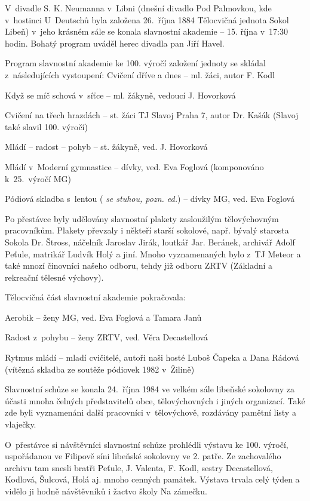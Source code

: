 \documentclass[a5paper, 11pt, twoside]{article}
\newcommand{\pozned}[1]{%
\textit{#1}}
\begin{document}
V~divadle S. K. Neumanna v~Libni (dnešní divadlo Pod Palmovkou, kde
v~hostinci U~Deutschů byla založena 26.~října 1884 Tělocvičná jednota
Sokol Libeň) v~jeho krásném sále se konala slavnostní akademie -- 15.
října v~17:30 hodin. Bohatý program uváděl herec divadla pan Jiří Havel.

Program slavnostní akademie ke 100. výročí založení jednoty se
skládal z~následujících vystoupení:
\smallskip
Cvičení dříve a dnes -- ml. žáci, autor F. Kodl

Když se míč schová v~síťce -- ml. žákyně, vedoucí J. Hovorková

Cvičení na třech hrazdách -- st. žáci TJ Slavoj Praha 7, autor Dr.
Kašák (Slavoj také slavil 100. výročí)

Mládí -- radost -- pohyb -- st. žákyně, ved. J. Hovorková

{\sloppy Mládí v~Moderní gymnastice -- dívky, ved. Eva Foglová (komponováno k~25.~výročí MG) \par}

Pódiová skladba s~lentou (\pozned{se stuhou, pozn. ed.}) -- dívky MG,
ved. Eva Foglová

\smallskip
Po přestávce byly udělovány slavnostní plakety zasloužilým tělovýchovným
pracovníkům. Plakety převzaly i někteří starší sokolové, např. bývalý
starosta Sokola Dr. Štross, náčelník Jaroslav Jirák, loutkář Jar.
Beránek, archivář Adolf Peťule, matrikář Ludvík Holý a jiní. Mnoho
vyznamenaných bylo z~TJ Meteor a také mnozí činovníci našeho odboru,
tehdy již odboru ZRTV (Základní a rekreační tělesné výchovy).

Tělocvičná část slavnostní akademie pokračovala:

\medskip
Aerobik -- ženy MG, ved. Eva Foglová a Tamara Janů

Radost z~pohybu -- ženy ZRTV, ved. Věra Decastellová

Rytmus mládí -- mladí cvičitelé, autoři naši hosté Luboš Čapeka a
Dana Rádová (vítězná skladba ze soutěže pódiovek 1982 v~Žilině)

\medskip
Slavnostní schůze se konala 24.~října 1984 ve velkém sále libeňské
sokolovny za účasti mnoha čelných představitelů obce, tělovýchovných i
jiných organizací. Také zde byli vyznamenáni další pracovníci
v~tělovýchově, rozdávány pamětní listy a vlaječky.

O~přestávce si návštěvníci slavnostní schůze prohlédli výstavu ke 100.
výročí, uspořádanou ve Filipově síni libeňské sokolovny ve 2. patře. Ze
zachovalého archivu tam snesli bratři Peťule, J. Valenta, F. Kodl,
sestry Decastellová, Kodlová, Šulcová, Holá aj. mnoho cenných památek.
Výstava trvala celý týden a vidělo ji hodně návštěvníků i žactvo školy
Na zámečku.
\end{document}
